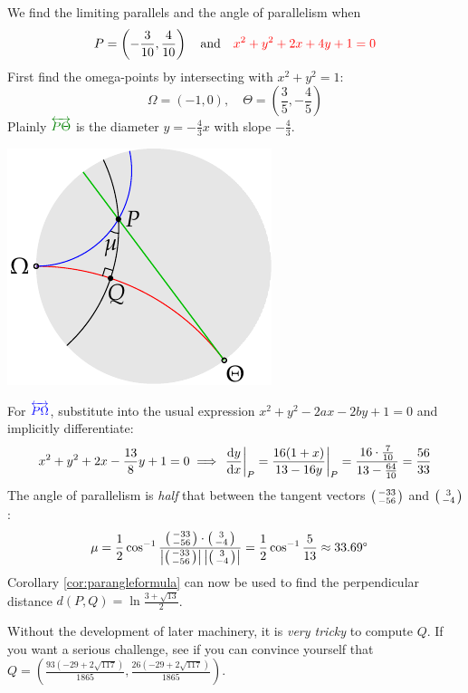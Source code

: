 \begin{examples}{}{}
\begin{enumerate}
		\begin{minipage}[t]{0.68\linewidth}\vspace{0pt}
		  \item We find the limiting parallels and the angle of parallelism when
			\[
				P=\left(-\frac 3{10},\frac 4{10}\right)\quad\text{and}\quad \textcolor{red}{x^2+y^2+2x+4y+1=0}
			\]
			First find the omega-points by intersecting with $x^2+y^2=1$:
			\[
				\Omega=(-1,0),\quad \Theta=\left(\frac 35,-\frac 45\right)
			\]
			Plainly $\textcolor{Green}{\overleftrightarrow{P\Theta}}$ is the diameter $y=-\frac 43x$ with slope $-\frac 43$.
		\end{minipage}
		\hfill
		\begin{minipage}[t]{0.31\linewidth}\vspace{0pt}
			\flushright\includegraphics{basic-parallels3}
		\end{minipage}\smallbreak
		For $\textcolor{blue}{\overleftrightarrow{P\Omega}}$, substitute into the usual expression $x^2+y^2-2ax-2by+1=0$ and implicitly differentiate:
		\[
			x^2+y^2+2x-\frac{13}8y+1=0\implies \diffat[y]{x}{P}=\frac{16(1+x)}{13-16y}\bigg|_P=\frac{16\cdot\frac 7{10}}{13-\frac{64}{10}}=\frac{56}{33}
		\]
		The angle of parallelism is \emph{half} that between the tangent vectors $\stwovec{-33}{-56}$ and $\stwovec 3{-4}$:
		\begin{align*}
			\mu&=\frac 12\cos^{-1}\frac{\stwovec{-33}{-56}\cdot\stwovec{3}{-4}}{\nm{\stwovec{-33}{-56}}\nm{\stwovec{3}{-4}}}
			=\frac 12\cos^{-1}\frac 5{13}\approx \ang{33.69}
		\end{align*}
		Corollary \ref{cor:parangleformula} can now be used to find the perpendicular distance $d(P,Q)=\ln\frac{3+\sqrt{13}}2$.\par
		Without the development of later machinery, it is \emph{very tricky} to compute $Q$. If you want a serious challenge, see if you can convince yourself that $Q=\left(\frac{93(-29+2\sqrt{117})}{1865}, \frac{26(-29+2\sqrt{117})}{1865}\right)$.
	\end{enumerate}
\end{examples}


